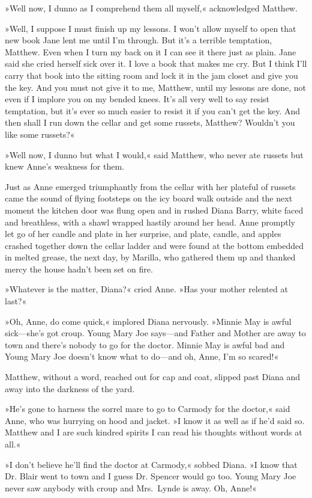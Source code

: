 »Well now, I dunno as I comprehend them all myself,« acknowledged Matthew.

»Well, I suppose I must finish up my lessons. I won't allow myself to open that new book Jane lent me until I'm through. But it's a terrible temptation, Matthew. Even when I turn my back on it I can see it there just as plain. Jane said she cried herself sick over it. I love a book that makes me cry. But I think I'll carry that book into the sitting room and lock it in the jam closet and give you the key. And you must not give it to me, Matthew, until my lessons are done, not even if I implore you on my bended knees. It's all very well to say resist temptation, but it's ever so much easier to resist it if you can't get the key. And then shall I run down the cellar and get some russets, Matthew? Wouldn't you like some russets?«

»Well now, I dunno but what I would,« said Matthew, who never ate russets but knew Anne's weakness for them.

Just as Anne emerged triumphantly from the cellar with her plateful of russets came the sound of flying footsteps on the icy board walk outside and the next moment the kitchen door was flung open and in rushed Diana Barry, white faced and breathless, with a shawl wrapped hastily around her head. Anne promptly let go of her candle and plate in her surprise, and plate, candle, and apples crashed together down the cellar ladder and were found at the bottom embedded in melted grease, the next day, by Marilla, who gathered them up and thanked mercy the house hadn't been set on fire.

»Whatever is the matter, Diana?« cried Anne. »Has your mother relented at last?«

»Oh, Anne, do come quick,« implored Diana nervously. »Minnie May is awful sick—she's got croup. Young Mary Joe says—and Father and Mother are away to town and there's nobody to go for the doctor. Minnie May is awful bad and Young Mary Joe doesn't know what to do—and oh, Anne, I'm so scared!«

Matthew, without a word, reached out for cap and coat, slipped past Diana and away into the darkness of the yard.

»He's gone to harness the sorrel mare to go to Carmody for the doctor,« said Anne, who was hurrying on hood and jacket. »I know it as well as if he'd said so. Matthew and I are such kindred spirits I can read his thoughts without words at all.«

»I don't believe he'll find the doctor at Carmody,« sobbed Diana. »I know that Dr. Blair went to town and I guess Dr. Spencer would go too. Young Mary Joe never saw anybody with croup and Mrs.~Lynde is away. Oh, Anne!«

